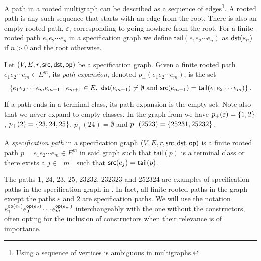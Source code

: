 A path in a rooted multigraph can be described as a sequence of edges\footnote{Using a sequence of vertices is ambiguous in multigraphs.}. A rooted path is any such sequence that starts with an edge from the root. There is also an empty rooted path, $\varepsilon$, corresponding to going nowhere from the root. For a finite rooted path $e_1e_2\dotsm e_n$ in a specification graph we define $\textsf{tail}(e_1e_2\dotsm e_n)$ as $\textsf{dst}(e_n)$ if $n>0$ and the root otherwise.

\begin{definition}
Let $(V,E,r,\textsf{src},\textsf{dst},\textsf{op})$ be a specification graph. Given a finite rooted path $e_1e_2\dotsm e_m \in E^m$, its \emph{path expansion}, denoted $p_+(e_1e_2\dotsm e_m)$,
is the set 
\[
    \left\{e_1e_2\dotsm e_m e_{m+1} \mid e_{m+1} \in E, \ \textsf{dst}(e_{m+1}) \neq \emptyset \text{ and } \textsf{src}(e_{m+1}) = \textsf{tail}(e_1e_2\dotsm e_m)\right\}.
\]
\end{definition}
If a path ends in a terminal class, its path expansion is the empty set. Note also that we never expand to empty classes. In the graph from  we have $p_+(\varepsilon) = \left\{1,2\right\}$, $p_+(2) = \left\{23,24,25\right\}$, $p_+(24) = \emptyset$ and $p_+(2523) = \left\{25231, 25232\right\}$.


\begin{definition}
A \emph{specification path} in a specification graph $(V,E,r,\textsf{src},\textsf{dst},\textsf{op})$ is a finite rooted path $p=e_1e_2\dotsm e_m \in E^m$ in said graph such that $\textsf{tail}(p)$ is a terminal class or there exists a $j\in[m]$ such that $\textsf{src}(e_j) = \textsf{tail}(p)$.
\end{definition}
The paths $1$, $24$, $23$, $25$, $23232$, $232323$ and $252324$ are examples of specification paths in the specification graph in . In fact, all finite rooted paths in the graph except the paths $\varepsilon$ and $2$ are specification paths. We will use the notation $e_1^{\textsf{op}(e_1)}e_2^{\textsf{op}(e_2)}\dotsm e_m^{\textsf{op}(e_m)}$ interchangeably with the one without the constructors, often opting for the inclusion of constructors when their relevance is of importance. 


